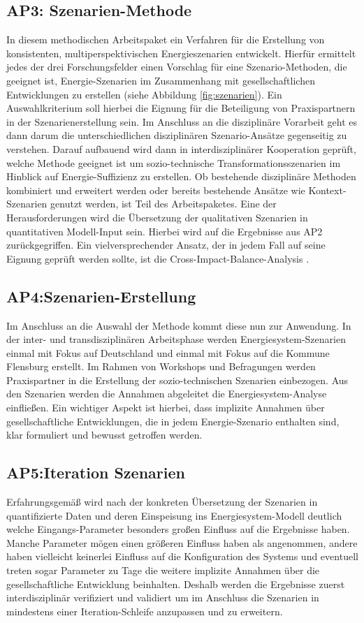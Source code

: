 \documentclass[a4paper,11pt,twoside]{scrartcl}
\begin{document}
\subsection*{AP3: Szenarien-Methode}
In diesem methodischen Arbeitspaket ein Verfahren für die Erstellung von konsistenten, multiperspektivischen Energieszenarien entwickelt. Hierfür ermittelt jedes der drei Forschungsfelder einen Vorschlag für eine Szenario-Methoden, die geeignet ist, Energie-Szenarien im Zusammenhang mit gesellschaftlichen Entwicklungen zu erstellen (siehe Abbildung \ref{fig:szenarien}). Ein Auswahlkriterium soll hierbei die Eignung für die Beteiligung von Praxispartnern in der Szenarienerstellung sein. Im Anschluss an die disziplinäre Vorarbeit geht es dann darum die unterschiedlichen disziplinären Szenario-Ansätze gegenseitig zu verstehen. Darauf aufbauend wird dann in interdisziplinärer Kooperation geprüft, welche Methode geeignet ist um sozio-technische Transformationsszenarien im Hinblick auf Energie-Suffizienz zu erstellen. Ob bestehende disziplinäre Methoden kombiniert und erweitert werden oder bereits bestehende Ansätze wie Kontext-Szenarien genutzt werden, ist Teil des Arbeitspaketes. Eine der Herausforderungen wird die Übersetzung der qualitativen Szenarien in quantitativen Modell-Input sein. Hierbei wird auf die Ergebnisse aus AP2 zurückgegriffen. Ein vielversprechender Ansatz, der in jedem Fall auf seine Eignung geprüft werden sollte, ist die Cross-Impact-Balance-Analysis \cite{WEIMERJEHLE2016}.

\subsection*{AP4:Szenarien-Erstellung}
Im Anschluss an die Auswahl der Methode kommt diese nun zur Anwendung. In der inter- und transdisziplinären Arbeitsphase werden Energiesystem-Szenarien einmal mit Fokus auf Deutschland und einmal mit Fokus auf die Kommune Flensburg erstellt. Im Rahmen von Workshops und Befragungen werden Praxispartner in die Erstellung der sozio-technischen Szenarien einbezogen. Aus den Szenarien werden die Annahmen abgeleitet die Energiesystem-Analyse einfließen. Ein wichtiger Aspekt ist hierbei, dass implizite Annahmen über gesellschaftliche Entwicklungen, die in jedem Energie-Szenario enthalten sind, klar formuliert und bewusst getroffen werden.

\subsection*{AP5:Iteration Szenarien}
Erfahrungsgemäß wird nach der konkreten Übersetzung der Szenarien in quantifizierte Daten und deren Einspeisung ins Energiesystem-Modell deutlich welche Eingangs-Parameter besonders großen Einfluss auf die Ergebnisse haben. Manche Parameter mögen einen größeren Einfluss haben als angenommen, andere haben vielleicht keinerlei Einfluss auf die Konfiguration des Systems und eventuell treten sogar Parameter zu Tage die weitere implizite Annahmen über die gesellschaftliche Entwicklung beinhalten. Deshalb werden die Ergebnisse zuerst interdisziplinär verifiziert und validiert um im Anschluss die Szenarien in mindestens einer Iteration-Schleife anzupassen und zu erweitern.
\end{document}
